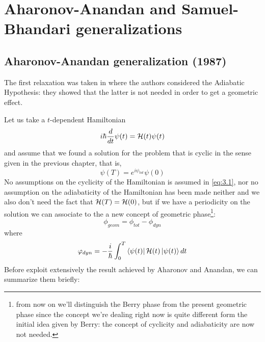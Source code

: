 \chapter{Aharonov-Anandan and Samuel-Bhandari generalizations}
\section{Aharonov-Anandan generalization (1987)}
The first relaxation was taken in \cite{aharonov1987phase} where the authors considered the Adiabatic Hypothesis: they showed that the latter is not needed in order to get a geometric effect. 

Let us take a $ t $-dependent Hamiltonian
\begin{equation}
i\hbar\frac{d}{dt}\psi(t)=\mathcal{H}(t)\psi(t)
\end{equation}
and assume that we found a solution for the problem that is cyclic in the sense given in the previous chapter, that is,
\begin{equation}
\psi(T)=e^{i\psi_{tot}}\psi(0)
\label{eq:3.1}
\end{equation}
No assumptions on the cyclicity of the Hamiltonian is assumed in \eqref{eq:3.1}, nor no assumption on the adiabaticity of the Hamiltonian has been made neither and we also don't need the fact that $ \mathcal{H}(T)=\mathcal{H}(0) $, but if we have a periodicity on the solution we can associate to the \wf a new concept of geometric phase\footnote{from now on we'll distinguish the Berry phase from the present geometric phase since the concept we're dealing right now is quite different form the initial idea given by Berry: the concept of cyclicity and adiabaticity are now not needed.}: 
\begin{equation}
\phi_{geom}=\phi_{tot}-\phi_{dyn}
\end{equation}
where
\begin{equation}
\varphi_{dyn}=-\dfrac{i}{\hbar}\int_{0}^{T}\Bra{\psi(t)}\mathcal{H}(t)\Ket{\psi(t)}\mathop{}\!d t
\label{eq:phi_dyn}
\end{equation}
Before exploit extensively the result achieved by Aharonov and Anandan, we can summarize them briefly:
